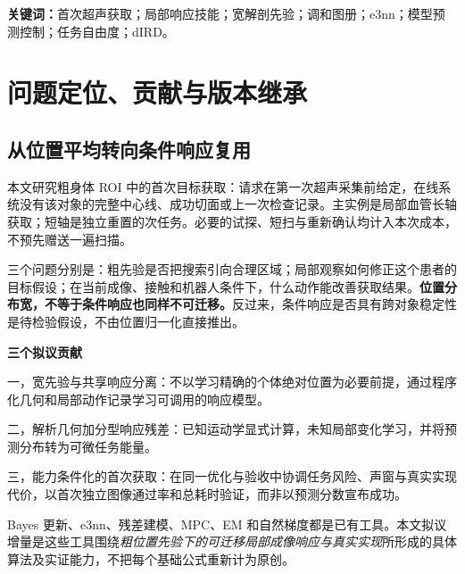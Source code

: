 \documentclass[UTF8,fontset=fandol,11pt,a4paper]{ctexart}
\theoremstyle{plain}
\theoremstyle{definition}
\theoremstyle{remark}
\numberwithin{equation}{section}
\begin{document}
\begin{abstract}
个体内部血管与脏器的位置差异，不宜被压缩成一条必须跟随的平均轨迹；但这不意味着跨对象学习没有价值。本文提出 Anatomical GPS V9.3，将“在哪里搜索”“当前对象是什么”和“局部动作会产生什么成像后果”分开建模。公开的身体图册及相关、多模式宽先验只提供粗搜索支持；本次检查的局部超声更新目标与关联假设；共享 e3nn 模型在已知几何响应上学习条件残差、检测概率和视角相关质量，并形成可微任务能量。该能量与粗骨声路代价、dIRD 能力引导和真实运动成本统一求解，V6.1 的后验任务自由度约束平滑、接触修正后的最终动作。系统不等待完整器官拟合或全局信息图，不把一次已完成短轴检查作为长轴获取的免费起点。理论给出宽先验的支持边界、切片交点响应的局部正则条件、分型技能能量及其梯度的坐标规律、动作条件模型的局部迁移和排序误差界、可检验的模型梯度下降条件，以及任务风险与真实执行误差的验收接口。EM 仅作为固定窗口内关联和几何修正的可选求解器，不把控制优化混称为 M 步。实验在既有 DMP\_playground 接口上，依次检验信息隔离、先验与技能的独立作用、局部响应迁移、声窗与机器人能力冲突、关联消融及真实 8DoF 执行；再进入冻结模型的真实声学验证。预期效果、无效情形和失败解释均事前声明，不预填性能数值。
\end{abstract}
\noindent\textbf{关键词：}首次超声获取；局部响应技能；宽解剖先验；调和图册；e3nn；模型预测控制；任务自由度；dIRD。
\setcounter{tocdepth}{1}
\begingroup\small\setlength{\parskip}{0pt}\tableofcontents\endgroup
\clearpage

\section{问题定位、贡献与版本继承}
\label{sec:problem}
\subsection{从位置平均转向条件响应复用}
本文研究粗身体 ROI 中的首次目标获取：请求在第一次超声采集前给定，在线系统没有该对象的完整中心线、成功切面或上一次检查记录。主实例是局部血管长轴获取；短轴是独立重置的次任务。必要的试探、短扫与重新确认均计入本次成本，不预先赠送一遍扫描。

三个问题分别是：粗先验是否把搜索引向合理区域；局部观察如何修正这个患者的目标假设；在当前成像、接触和机器人条件下，什么动作能改善获取结果。\textbf{位置分布宽，不等于条件响应也同样不可迁移。}反过来，条件响应是否具有跨对象稳定性是待检验假设，不由位置归一化直接推出。

\begin{corebox}
\textbf{三个拟议贡献}\par
一，宽先验与共享响应分离：不以学习精确的个体绝对位置为必要前提，通过程序化几何和局部动作记录学习可调用的响应模型。\par
二，解析几何加分型响应残差：已知运动学显式计算，未知局部变化学习，并将预测分布转为可微任务能量。\par
三，能力条件化的首次获取：在同一优化与验收中协调任务风险、声窗与真实实现代价，以首次独立图像通过率和总耗时验证，而非以预测分数宣布成功。
\end{corebox}
Bayes 更新、e3nn、残差建模、MPC、EM 和自然梯度都是已有工具。本文拟议增量是这些工具围绕\emph{粗位置先验下的可迁移局部成像响应与真实实现}所形成的具体算法及实证能力，不把每个基础公式重新计为原创。
\end{document}
